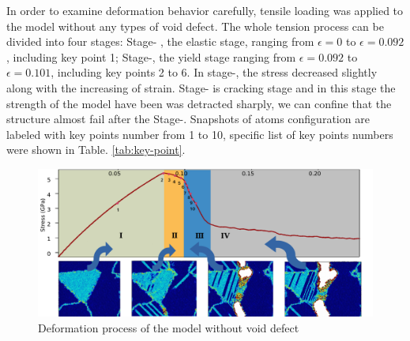 \documentclass[materials,article,submit,moreauthors,pdftex,10pt,a4paper]{Definitions/mdpi}
\begin{document}
In order to examine deformation behavior carefully, tensile loading was applied to the model without any types of void defect. The whole tension process can be divided into four stages: Stage-\uppercase\expandafter{} , the elastic stage, ranging from $\epsilon = 0$ to $\epsilon = 0.092$, including key point 1; Stage-\uppercase\expandafter{}, the yield stage ranging from $\epsilon = 0.092$ to $\epsilon = 0.101$, including key points 2 to 6. In stage-\uppercase\expandafter{}, the stress decreased slightly along with the increasing of strain. Stage-\uppercase\expandafter{} is cracking stage and in this stage the strength of the model have been was detracted sharply, we can confine that the structure almost fail after the Stage-\uppercase\expandafter{}. Snapshots of atoms configuration are labeled with key points number from 1 to 10, specific list of key points numbers were shown in Table. \ref{tab:key-point}.
 
\begin{figure}[ht]
	\centering
	\includegraphics[width=1\linewidth]{img/perfect-line2-2}
	\caption{Deformation process of the model without void defect}
	\label{fig:deformation-pf}
\end{figure}
\end{document}
